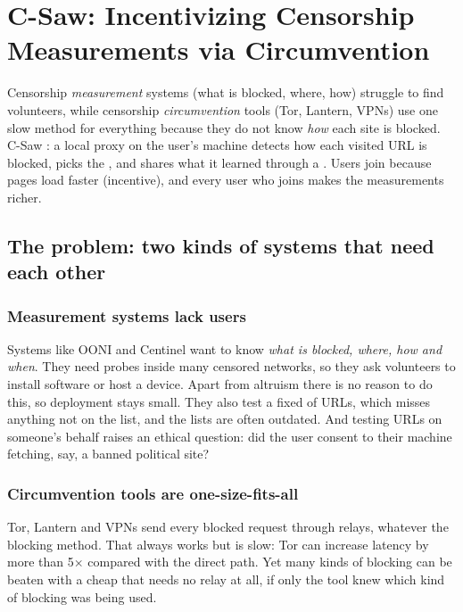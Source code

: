 \chapter{C-Saw: Incentivizing Censorship Measurements via Circumvention}

\begin{keybox}
Censorship \emph{measurement} systems (what is blocked, where, how) struggle to find volunteers, while censorship \emph{circumvention}
tools (Tor, Lantern, VPNs) use one slow method for everything because they do not know \emph{how} each site is blocked. C-Saw
: a local proxy on the user's machine detects how each visited URL is blocked, picks the , and shares what it learned through a . Users
join because pages load faster (incentive), and every user who joins makes the measurements richer.
\end{keybox}

\section{The problem: two kinds of systems that need each other}

\subsection{Measurement systems lack users}
Systems like OONI and Centinel want to know \emph{what is blocked, where, how and when}. They need probes inside many censored networks,
so they ask volunteers to install software or host a device. Apart from altruism there is no reason to do this, so deployment stays small.
They also test a fixed  of URLs, which misses anything not on the list, and the lists are often outdated. And testing
URLs on someone's behalf raises an ethical question: did the user consent to their machine fetching, say, a banned political site?

\subsection{Circumvention tools are one-size-fits-all}
Tor, Lantern and VPNs send every blocked request through relays, whatever the blocking method. That always works but is slow: Tor can
increase latency by more than 5$\times$ compared with the direct path. Yet many kinds of blocking can be beaten with a cheap
 that needs no relay at all, if only the tool knew which kind of blocking was being used.


